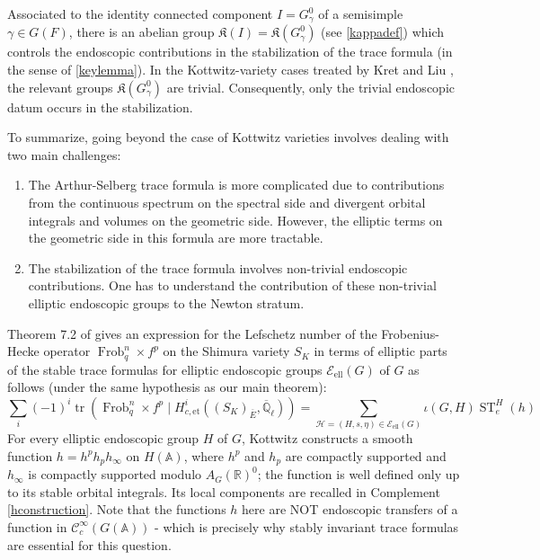 \documentclass[11pt,a4paper]{article}
\newcommand{\Eell}{\mathcal{E}_{\mathrm{ell}}}
\theoremstyle{definition}
\theoremstyle{plain}
\theoremstyle{remark}
\theoremstyle{plain}
\DeclareMathOperator{\Frob}{Frob}
\DeclareMathOperator{\tr}{tr}
\DeclareMathOperator{\ST}{ST}
\begin{document}
Associated to the identity connected component $I = G_{\gamma}^0$ of a semisimple $\gamma \in G(F)$, there is an abelian group $\mathfrak{K}(I) = \mathfrak{K}( G_{\gamma}^0)$ (see \ref{kappadef}) which controls the endoscopic contributions in the stabilization of the trace formula (in the sense of \ref{keylemma}). In the Kottwitz-variety cases treated by Kret \cite{MR3048605} and Liu \cite{liu2025cohomologycertainintermediatestrata,liu2024automorphicdescriptionzetafunction}, the relevant groups $\mathfrak{K}(G_{\gamma}^0)$ are trivial. Consequently, only the trivial endoscopic datum occurs in the stabilization.

To summarize, going beyond the case of Kottwitz varieties involves dealing with two main challenges:
\begin{enumerate}
    \item The Arthur-Selberg trace formula is more complicated due to contributions from the continuous spectrum on the spectral side and divergent orbital integrals and volumes on the geometric side. However, the elliptic terms on the geometric side in this formula are more tractable.
    \item The stabilization of the trace formula involves non-trivial endoscopic contributions. One has to understand the contribution of these non-trivial elliptic endoscopic groups to the Newton stratum. 
\end{enumerate}

Theorem 7.2 of \cite{MR1044820} gives an expression for the Lefschetz number of the Frobenius-Hecke operator $\Frob_q^n \times f^p$ on the Shimura variety $S_K$ in terms of elliptic parts of the stable trace formulas for elliptic endoscopic groups $\Eell(G)$ of $G$ as follows (under the same hypothesis as our main theorem):
\begin{equation*}
		 \sum_i (-1)^i \tr(\Frob_q^n \times f^p \mid H^i_{c,\mathrm{et}}((S_K)_{\overline{E}}, \overline{\mathbb{Q}}_\ell)) = \sum_{\mathcal{H} = (H,s,\eta) \in \Eell(G)} \iota (G,H) \ST_e^H(h)
\end{equation*}
For every elliptic endoscopic group $H$ of $G$, Kottwitz constructs a smooth function $h=h^ph_ph_{\infty}$ on $H(\mathbb{A})$, where $h^p$ and $h_p$ are compactly supported and $h_{\infty}$ is compactly supported modulo $A_G(\mathbb{R})^0$; the function is well defined only up to its stable orbital integrals. Its local components are recalled in Complement \ref{hconstruction}. Note that the functions $h$ here are NOT endoscopic transfers of a function in $\mathcal{C}^{\infty}_c(G(\mathbb{A}))$ - which is precisely why stably invariant trace formulas are essential for this question.
\end{document}
